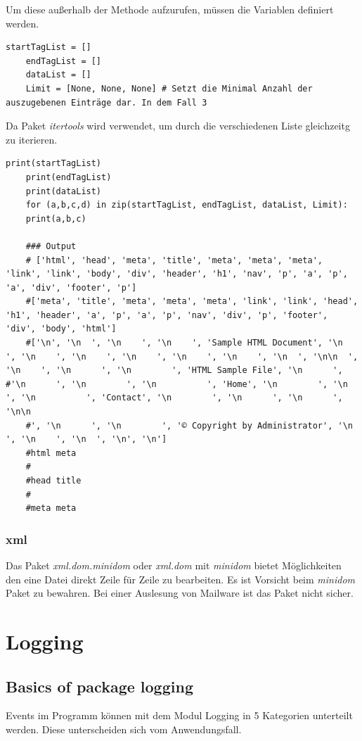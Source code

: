 Um diese außerhalb der Methode aufzurufen, müssen die Variablen definiert werden.
\begin{lstlisting}[style=python]
	startTagList = []
	endTagList = []
	dataList = []
	Limit = [None, None, None] # Setzt die Minimal Anzahl der auszugebenen Einträge dar. In dem Fall 3
\end{lstlisting}

Da Paket \textit{itertools} wird verwendet, um durch die verschiedenen Liste gleichzeitg zu iterieren.
\begin{lstlisting}[style=python]
	print(startTagList)
	print(endTagList)
	print(dataList)
	for (a,b,c,d) in zip(startTagList, endTagList, dataList, Limit):
	print(a,b,c)
	
	### Output
	# ['html', 'head', 'meta', 'title', 'meta', 'meta', 'meta', 'link', 'link', 'body', 'div', 'header', 'h1', 'nav', 'p', 'a', 'p', 'a', 'div', 'footer', 'p']
	#['meta', 'title', 'meta', 'meta', 'meta', 'link', 'link', 'head', 'h1', 'header', 'a', 'p', 'a', 'p', 'nav', 'div', 'p', 'footer', 'div', 'body', 'html']
	#['\n', '\n  ', '\n    ', '\n    ', 'Sample HTML Document', '\n    ', '\n    ', '\n    ', '\n    ', '\n    ', '\n    ', '\n  ', '\n\n  ', '\n    ', '\n      ', '\n        ', 'HTML Sample File', '\n      ', #'\n      ', '\n        ', '\n          ', 'Home', '\n        ', '\n        ', '\n          ', 'Contact', '\n        ', '\n      ', '\n      ', '\n\n 
	#', '\n      ', '\n        ', '© Copyright by Administrator', '\n      ', '\n    ', '\n  ', '\n', '\n']
	#html meta
	#
	#head title
	#
	#meta meta 
\end{lstlisting}


\subsubsection{xml}
Das Paket \textit{xml.dom.minidom} oder \textit{xml.dom} mit \textit{minidom} bietet Möglichkeiten den eine Datei direkt Zeile für Zeile zu bearbeiten.
Es ist Vorsicht beim \textit{minidom} Paket zu bewahren. Bei einer Auslesung von Mailware ist das Paket nicht sicher.

\section{Logging}
\subsection{Basics of package logging} 
Events im Programm können mit dem Modul Logging in 5 Kategorien unterteilt werden. Diese unterscheiden sich vom Anwendungsfall.

